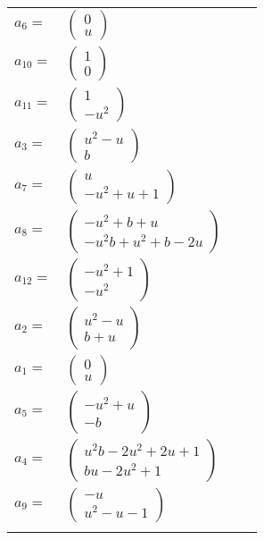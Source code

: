 \documentclass[1p]{elsarticle_modified}
\theoremstyle{definition}
\begin{document}
\begin{tabular}{m{7pt} m{180pt} m{7pt} m{180pt} }
\flushright $a_{6}=$&$\begin{pmatrix}0\\u\end{pmatrix}$ \\
\flushright $a_{10}=$&$\begin{pmatrix}1\\0\end{pmatrix}$ \\
\flushright $a_{11}=$&$\begin{pmatrix}1\\- u^2\end{pmatrix}$ \\
\flushright $a_{3}=$&$\begin{pmatrix}u^2- u\\b\end{pmatrix}$ \\
\flushright $a_{7}=$&$\begin{pmatrix}u\\- u^2+u+1\end{pmatrix}$ \\
\flushright $a_{8}=$&$\begin{pmatrix}- u^2+b+u\\- u^2 b+u^2+b-2 u\end{pmatrix}$ \\
\flushright $a_{12}=$&$\begin{pmatrix}- u^2+1\\- u^2\end{pmatrix}$ \\
\flushright $a_{2}=$&$\begin{pmatrix}u^2- u\\b+u\end{pmatrix}$ \\
\flushright $a_{1}=$&$\begin{pmatrix}0\\u\end{pmatrix}$ \\
\flushright $a_{5}=$&$\begin{pmatrix}- u^2+u\\- b\end{pmatrix}$ \\
\flushright $a_{4}=$&$\begin{pmatrix}u^2 b-2 u^2+2 u+1\\b u-2 u^2+1\end{pmatrix}$ \\
\flushright $a_{9}=$&$\begin{pmatrix}- u\\u^2- u-1\end{pmatrix}$\\&\end{tabular}
\end{document}

